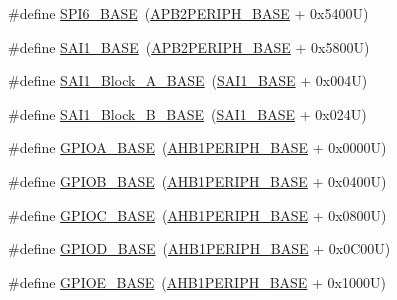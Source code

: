 \begin{DoxyCompactItemize}
\item 
\#define \hyperlink{group___peripheral__memory__map_gaf69c602bd348dc0aa1b4e829e40ebb70}{S\+P\+I6\+\_\+\+B\+A\+SE}~(\hyperlink{group___peripheral__memory__map_ga25b99d6065f1c8f751e78f43ade652cb}{A\+P\+B2\+P\+E\+R\+I\+P\+H\+\_\+\+B\+A\+SE} + 0x5400\+U)
\item 
\#define \hyperlink{group___peripheral__memory__map_ga24c1053b754946b512f9c31123e09d21}{S\+A\+I1\+\_\+\+B\+A\+SE}~(\hyperlink{group___peripheral__memory__map_ga25b99d6065f1c8f751e78f43ade652cb}{A\+P\+B2\+P\+E\+R\+I\+P\+H\+\_\+\+B\+A\+SE} + 0x5800\+U)
\item 
\#define \hyperlink{group___peripheral__memory__map_ga31f72e5e5d7aea23bc8a5191bc32e900}{S\+A\+I1\+\_\+\+Block\+\_\+\+A\+\_\+\+B\+A\+SE}~(\hyperlink{group___peripheral__memory__map_ga24c1053b754946b512f9c31123e09d21}{S\+A\+I1\+\_\+\+B\+A\+SE} + 0x004\+U)
\item 
\#define \hyperlink{group___peripheral__memory__map_gacdb59b321830def8c7a57c154178bc48}{S\+A\+I1\+\_\+\+Block\+\_\+\+B\+\_\+\+B\+A\+SE}~(\hyperlink{group___peripheral__memory__map_ga24c1053b754946b512f9c31123e09d21}{S\+A\+I1\+\_\+\+B\+A\+SE} + 0x024\+U)
\item 
\#define \hyperlink{group___peripheral__memory__map_gad7723846cc5db8e43a44d78cf21f6efa}{G\+P\+I\+O\+A\+\_\+\+B\+A\+SE}~(\hyperlink{group___peripheral__memory__map_ga811a9a4ca17f0a50354a9169541d56c4}{A\+H\+B1\+P\+E\+R\+I\+P\+H\+\_\+\+B\+A\+SE} + 0x0000\+U)
\item 
\#define \hyperlink{group___peripheral__memory__map_gac944a89eb789000ece920c0f89cb6a68}{G\+P\+I\+O\+B\+\_\+\+B\+A\+SE}~(\hyperlink{group___peripheral__memory__map_ga811a9a4ca17f0a50354a9169541d56c4}{A\+H\+B1\+P\+E\+R\+I\+P\+H\+\_\+\+B\+A\+SE} + 0x0400\+U)
\item 
\#define \hyperlink{group___peripheral__memory__map_ga26f267dc35338eef219544c51f1e6b3f}{G\+P\+I\+O\+C\+\_\+\+B\+A\+SE}~(\hyperlink{group___peripheral__memory__map_ga811a9a4ca17f0a50354a9169541d56c4}{A\+H\+B1\+P\+E\+R\+I\+P\+H\+\_\+\+B\+A\+SE} + 0x0800\+U)
\item 
\#define \hyperlink{group___peripheral__memory__map_ga1a93ab27129f04064089616910c296ec}{G\+P\+I\+O\+D\+\_\+\+B\+A\+SE}~(\hyperlink{group___peripheral__memory__map_ga811a9a4ca17f0a50354a9169541d56c4}{A\+H\+B1\+P\+E\+R\+I\+P\+H\+\_\+\+B\+A\+SE} + 0x0\+C00\+U)
\item 
\#define \hyperlink{group___peripheral__memory__map_gab487b1983d936c4fee3e9e88b95aad9d}{G\+P\+I\+O\+E\+\_\+\+B\+A\+SE}~(\hyperlink{group___peripheral__memory__map_ga811a9a4ca17f0a50354a9169541d56c4}{A\+H\+B1\+P\+E\+R\+I\+P\+H\+\_\+\+B\+A\+SE} + 0x1000\+U)

\end{DoxyCompactItemize}
